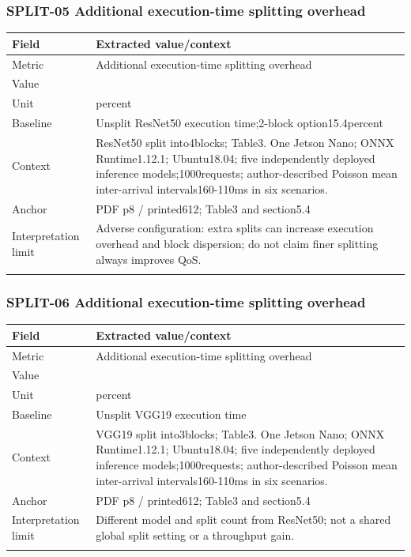\subsubsection*{SPLIT-05 Additional execution-time splitting overhead}
\begin{longtable}{>{\raggedright\arraybackslash}p{}>{\raggedright\arraybackslash}p{}}
\toprule
\textbf{Field} & \textbf{Extracted value/context}\\\midrule\endhead
Metric & Additional execution-time splitting overhead\\\addlinespace
Value & 50.3\\\addlinespace
Unit & percent\\\addlinespace
Baseline & Unsplit ResNet50 execution time;\allowbreak{}2-block option15.4percent\\\addlinespace
Context & ResNet50 split into4blocks;\allowbreak{} Table3. One Jetson Nano;\allowbreak{} ONNX Runtime1.12.1;\allowbreak{} Ubuntu18.04;\allowbreak{} five independently deployed inference models;\allowbreak{}1000requests;\allowbreak{} author-described Poisson mean inter-arrival intervals160-110ms in six scenarios.\\\addlinespace
Anchor & PDF p8 / printed612;\allowbreak{} Table3 and section5.4\\\addlinespace
Interpretation limit & Adverse configuration: extra splits can increase execution overhead and block dispersion;\allowbreak{} do not claim finer splitting always improves QoS.\\\addlinespace
\bottomrule\end{longtable}
\subsubsection*{SPLIT-06 Additional execution-time splitting overhead}
\begin{longtable}{>{\raggedright\arraybackslash}p{}>{\raggedright\arraybackslash}p{}}
\toprule
\textbf{Field} & \textbf{Extracted value/context}\\\midrule\endhead
Metric & Additional execution-time splitting overhead\\\addlinespace
Value & 18.1\\\addlinespace
Unit & percent\\\addlinespace
Baseline & Unsplit VGG19 execution time\\\addlinespace
Context & VGG19 split into3blocks;\allowbreak{} Table3. One Jetson Nano;\allowbreak{} ONNX Runtime1.12.1;\allowbreak{} Ubuntu18.04;\allowbreak{} five independently deployed inference models;\allowbreak{}1000requests;\allowbreak{} author-described Poisson mean inter-arrival intervals160-110ms in six scenarios.\\\addlinespace
Anchor & PDF p8 / printed612;\allowbreak{} Table3 and section5.4\\\addlinespace
Interpretation limit & Different model and split count from ResNet50;\allowbreak{} not a shared global split setting or a throughput gain.\\\addlinespace
\bottomrule\end{longtable}
